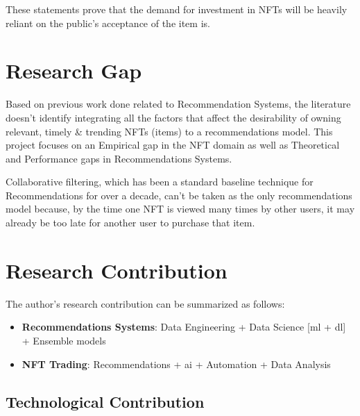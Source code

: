 \documentclass[a4paper, 12pt, oneside]{report}
\begin{document}
These statements prove that the demand for investment in NFTs will be heavily reliant on the public's acceptance of the item is.



\chapter{Research Gap}
Based on previous work done related to Recommendation Systems, the literature doesn't identify integrating all the factors that affect the desirability of owning relevant, timely \& trending NFTs (items) to a recommendations model. This project focuses on an Empirical gap in the NFT domain as well as Theoretical and Performance gaps in Recommendations Systems. 

Collaborative filtering, which has been a standard baseline technique for Recommendations for over a decade, can't be taken as the only recommendations model because, by the time one NFT is viewed many times by other users, it may already be too late for another user to purchase that item.


\chapter{Research Contribution}


The author's research contribution can be summarized as follows:
\begin{itemize}
\item \textbf{Recommendations Systems}: Data Engineering + Data Science [\Gls{ml} + \Gls{dl}] + Ensemble models
\item \textbf{NFT Trading}: Recommendations + \Gls{ai} + Automation + Data Analysis
\end{itemize}

\section{Technological Contribution}
\end{document}
